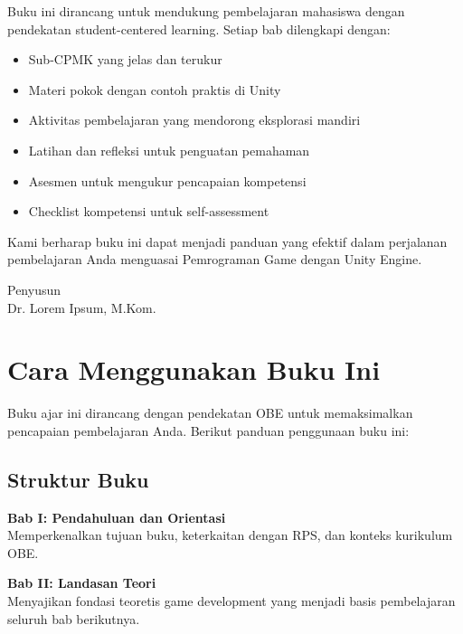 Buku ini dirancang untuk mendukung pembelajaran mahasiswa dengan pendekatan student-centered learning. Setiap bab dilengkapi dengan:
\begin{itemize}
  \item Sub-CPMK yang jelas dan terukur
  \item Materi pokok dengan contoh praktis di Unity
  \item Aktivitas pembelajaran yang mendorong eksplorasi mandiri
  \item Latihan dan refleksi untuk penguatan pemahaman
  \item Asesmen untuk mengukur pencapaian kompetensi
  \item Checklist kompetensi untuk self-assessment
\end{itemize}

Kami berharap buku ini dapat menjadi panduan yang efektif dalam perjalanan pembelajaran Anda menguasai Pemrograman Game dengan Unity Engine.

\vspace{1cm}
\begin{flushright}
Penyusun\\
Dr. Lorem Ipsum, M.Kom.
\end{flushright}

\cleardoublepage

\chapter*{Cara Menggunakan Buku Ini}

Buku ajar ini dirancang dengan pendekatan OBE untuk memaksimalkan pencapaian pembelajaran Anda. Berikut panduan penggunaan buku ini:

\section*{Struktur Buku}

\textbf{Bab I: Pendahuluan dan Orientasi}\\
Memperkenalkan tujuan buku, keterkaitan dengan RPS, dan konteks kurikulum OBE.

\textbf{Bab II: Landasan Teori}\\
Menyajikan fondasi teoretis game development yang menjadi basis pembelajaran seluruh bab berikutnya.

